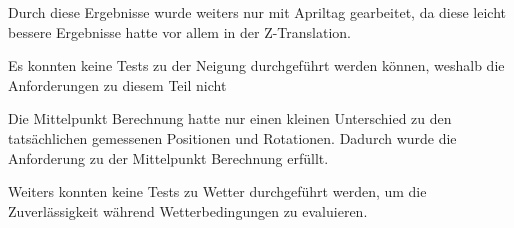 Durch diese Ergebnisse wurde weiters nur mit Apriltag gearbeitet, da diese leicht bessere Ergebnisse hatte vor allem in der Z-Translation.

Es konnten keine Tests zu der Neigung durchgeführt werden können, weshalb die Anforderungen zu diesem Teil nicht 

Die Mittelpunkt Berechnung hatte nur einen kleinen Unterschied zu den tatsächlichen gemessenen Positionen und Rotationen. 
Dadurch wurde die Anforderung zu der Mittelpunkt Berechnung erfüllt.

Weiters konnten keine Tests zu Wetter durchgeführt werden, um die Zuverlässigkeit während Wetterbedingungen zu evaluieren.



